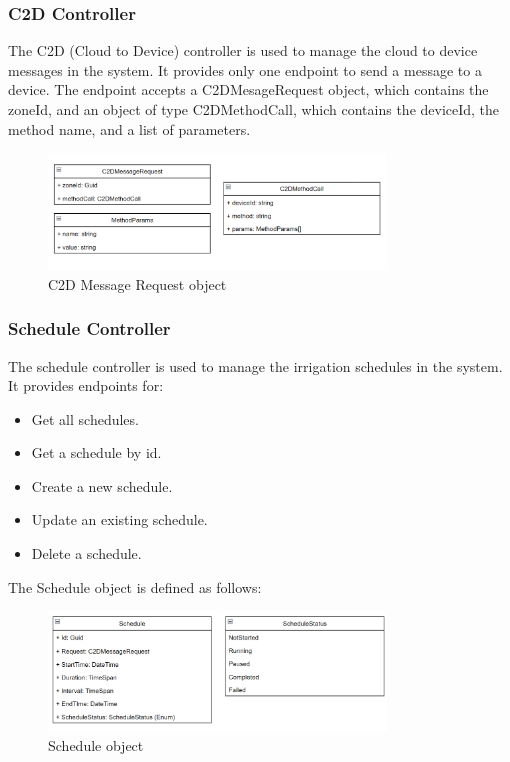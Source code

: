 \subsubsection{C2D Controller}
The C2D (Cloud to Device) controller is used to manage the cloud to device messages in the system.
It provides only one endpoint to send a message to a device. The endpoint accepts a C2DMesageRequest object, 
which contains the zoneId, and an object of type C2DMethodCall, which contains the deviceId, the method name, and a list of parameters.
\begin{figure}[H]
    \centering
    \includegraphics[width=0.8\textwidth]{images/c2d-message-request.png}
    \caption{C2D Message Request object}
    \label{fig:c2d-request}
\end{figure}

\subsubsection{Schedule Controller}
The schedule controller is used to manage the irrigation schedules in the system.
It provides endpoints for:
\begin{itemize}
    \item Get all schedules.
    \item Get a schedule by id.
    \item Create a new schedule.
    \item Update an existing schedule.
    \item Delete a schedule.
\end{itemize}

The Schedule object is defined as follows:
\begin{figure}[H]
    \centering
    \includegraphics[width=0.8\textwidth]{images/schedule.png}
    \caption{Schedule object}
    \label{fig:schedule-object}
\end{figure}

